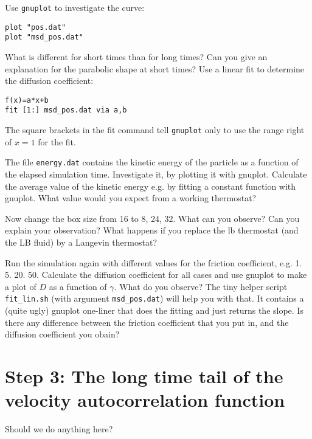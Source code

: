 Use  \lstinline|gnuplot|
to investigate the curve:
{\vspace{0,2cm}\small
\begin{lstlisting}[numbers=none]
plot "pos.dat"
plot "msd_pos.dat"
\end{lstlisting}\vspace{0,2cm}
}

What is different for short times than for long times?
Can you give an explanation for the parabolic shape at short
times?
Use a linear fit to determine the diffusion coefficient:
{\vspace{0,2cm}\small
\begin{lstlisting}[numbers=none]
f(x)=a*x+b
fit [1:] msd_pos.dat via a,b
\end{lstlisting}\vspace{0,2cm}
}
The square brackets in the fit command tell \lstinline{gnuplot}
only to use the range right of $x=1$ for the fit.

The file \lstinline|energy.dat| contains the kinetic energy of the
particle as a function of the elapsed simulation time. Investigate
it, by plotting it with gnuplot. Calculate the average value of 
the kinetic energy e.g. by fitting a constant function with gnuplot.
What value would you expect from a working thermostat?

Now change the box size from 16 to 8, 24, 32. What can you observe?
Can you explain your observation?
What happens if you replace the lb thermostat (and the LB fluid)
by a Langevin thermostat?

Run the simulation again with different values for the friction
coefficient, e.g. 1. 5. 20. 50. Calculate the diffusion
coefficient for all cases and use gnuplot to make a plot of
$D$ as a function of $\gamma$. What do you observe?
The tiny helper script \lstinline|fit_lin.sh| 
(with argument \lstinline|msd_pos.dat|)
will help you with that. It contains
a (quite ugly) gnuplot one-liner that does the fitting and just
returns the slope. Is there any difference between the
friction coefficient that you put in, and the diffusion coefficient
you obain?

\section{Step 3: The long time tail of the velocity autocorrelation function}
Should we do anything here?

